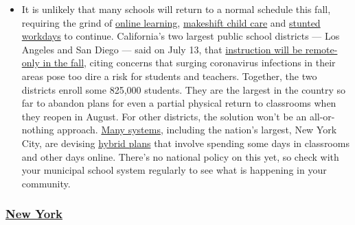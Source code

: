 \begin{itemize}
  \begin{itemize}
  \tightlist
  \item
    It is unlikely that many schools will return to a normal schedule
    this fall, requiring the grind of
    \href{https://www.nytimes3xbfgragh.onion/2020/06/05/us/coronavirus-education-lost-learning.html?action=click\&pgtype=Article\&state=default\&region=MAIN_CONTENT_3\&context=storylines_faq}{online
    learning},
    \href{https://www.nytimes3xbfgragh.onion/2020/05/29/us/coronavirus-child-care-centers.html?action=click\&pgtype=Article\&state=default\&region=MAIN_CONTENT_3\&context=storylines_faq}{makeshift
    child care} and
    \href{https://www.nytimes3xbfgragh.onion/2020/06/03/business/economy/coronavirus-working-women.html?action=click\&pgtype=Article\&state=default\&region=MAIN_CONTENT_3\&context=storylines_faq}{stunted
    workdays} to continue. California's two largest public school
    districts --- Los Angeles and San Diego --- said on July 13, that
    \href{https://www.nytimes3xbfgragh.onion/2020/07/13/us/lausd-san-diego-school-reopening.html?action=click\&pgtype=Article\&state=default\&region=MAIN_CONTENT_3\&context=storylines_faq}{instruction
    will be remote-only in the fall}, citing concerns that surging
    coronavirus infections in their areas pose too dire a risk for
    students and teachers. Together, the two districts enroll some
    825,000 students. They are the largest in the country so far to
    abandon plans for even a partial physical return to classrooms when
    they reopen in August. For other districts, the solution won't be an
    all-or-nothing approach.
    \href{https://bioethics.jhu.edu/research-and-outreach/projects/eschool-initiative/school-policy-tracker/}{Many
    systems}, including the nation's largest, New York City, are
    devising
    \href{https://www.nytimes3xbfgragh.onion/2020/06/26/us/coronavirus-schools-reopen-fall.html?action=click\&pgtype=Article\&state=default\&region=MAIN_CONTENT_3\&context=storylines_faq}{hybrid
    plans} that involve spending some days in classrooms and other days
    online. There's no national policy on this yet, so check with your
    municipal school system regularly to see what is happening in your
    community.
  \end{itemize}
\end{itemize}

\hypertarget{new-york}{%
\subsubsection{\texorpdfstring{\href{https://coronavirus.health.ny.gov/covid-19-travel-advisory}{New
York}}{New York}}\label{new-york}}

